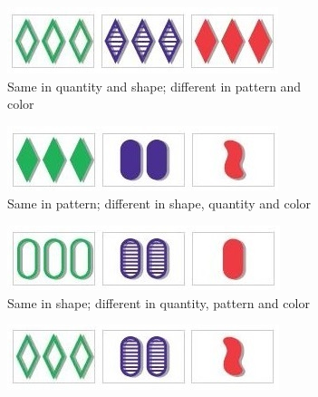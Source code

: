 \begin{problem}
\begin{figure}[H] %
\captionsetup[subfigure]{justification=centering}
\centering
\begin{subfigure}{.47\textwidth}
    \centering
    \includegraphics[width=\linewidth]{figures/set1.jpg}
    \caption{Same in quantity and shape; different in pattern and color}
    \label{fig:labelthefirstfigure}
\end{subfigure}
\begin{subfigure}{.47\textwidth}
    \centering
    \includegraphics[width=\linewidth]{figures/set2.jpg}
    \caption{Same in pattern; different in shape, quantity and color}
    \label{fig:labeltheotherfigure}
\end{subfigure}%
\begin{subfigure}{.47\textwidth}
    \centering
    \includegraphics[width=\linewidth]{figures/set3.jpg}
    \caption{Same in shape; different in quantity, pattern and color}
    \label{fig:labeltheotherfigure}
\end{subfigure}
\begin{subfigure}{.47\textwidth}
    \centering
    \includegraphics[width=\linewidth]{figures/set4.jpg}

\end{subfigure}
\end{figure}
\end{problem}
